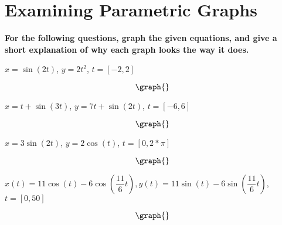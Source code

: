 \documentclass{ximera}
\begin{document}
\section{Examining Parametric Graphs}
\textbf{For the following questions, graph the given equations, and give a short explanation of why each graph looks the way it does.}
\begin{question}
$x = \sin(2t)$, $y = 2t^2$, $t = [-2,2]$

\[
\graph{}
\]

\begin{freeResponse}
\end{freeResponse}
$x = t + \sin(3t)$, $y = 7t + \sin(2t)$, $t = [-6,6]$

\[
\graph{}
\]

\begin{freeResponse}
\end{freeResponse}
$x = 3\sin(2t)$, $y = 2\cos(t)$, $t = [0,2*\pi]$

\[
\graph{}
\]

\begin{freeResponse}
\end{freeResponse}
$x(t) = 11\cos(t) - 6\cos(\dfrac{11}{6}t), y(t) = 11\sin(t) - 6\sin(\dfrac{11}{6} t)$, $t = [0,50]$

\[
\graph{}
\]

\begin{freeResponse}
\end{freeResponse}
\end{question}
\end{document}
